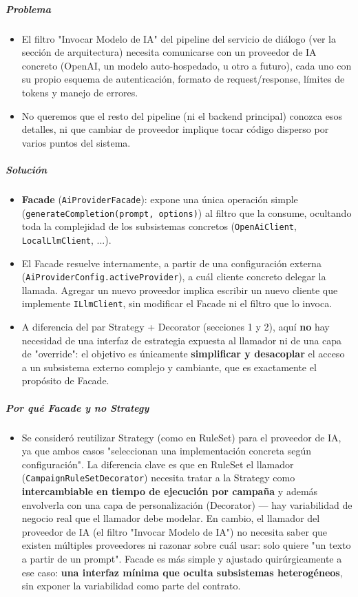 \subparagraph{Problema}
\begin{itemize}[itemsep=2pt,topsep=2pt]
\item El filtro "Invocar Modelo de IA" del pipeline del servicio de diálogo (ver la sección de arquitectura) necesita comunicarse con un proveedor de IA concreto (OpenAI, un modelo auto-hospedado, u otro a futuro), cada uno con su propio esquema de autenticación, formato de request/response, límites de tokens y manejo de errores.
\item No queremos que el resto del pipeline (ni el backend principal) conozca esos detalles, ni que cambiar de proveedor implique tocar código disperso por varios puntos del sistema.
\end{itemize}
\subparagraph{Solución}
\begin{itemize}[itemsep=2pt,topsep=2pt]
\item \textbf{Facade} (\texttt{AiProviderFacade}): expone una única operación simple (\texttt{generateCompletion(prompt, options)}) al filtro que la consume, ocultando toda la complejidad de los subsistemas concretos (\texttt{OpenAiClient}, \texttt{LocalLlmClient}, ...).
\item El Facade resuelve internamente, a partir de una configuración externa (\texttt{AiProviderConfig.\allowbreak{}activeProvider}), a cuál cliente concreto delegar la llamada. Agregar un nuevo proveedor implica escribir un nuevo cliente que implemente \texttt{ILlmClient}, sin modificar el Facade ni el filtro que lo invoca.
\item A diferencia del par Strategy + Decorator (secciones 1 y 2), aquí \textbf{no} hay necesidad de una interfaz de estrategia expuesta al llamador ni de una capa de "override": el objetivo es únicamente \textbf{simplificar y desacoplar} el acceso a un subsistema externo complejo y cambiante, que es exactamente el propósito de Facade.
\end{itemize}
\subparagraph{Por qué Facade y no Strategy}
\begin{itemize}[itemsep=2pt,topsep=2pt]
\item Se consideró reutilizar Strategy (como en RuleSet) para el proveedor de IA, ya que ambos casos "seleccionan una implementación concreta según configuración". La diferencia clave es que en RuleSet el llamador (\texttt{CampaignRuleSetDecorator}) necesita tratar a la Strategy como \textbf{intercambiable en tiempo de ejecución por campaña} y además envolverla con una capa de personalización (Decorator) — hay variabilidad de negocio real que el llamador debe modelar. En cambio, el llamador del proveedor de IA (el filtro "Invocar Modelo de IA") no necesita saber que existen múltiples proveedores ni razonar sobre cuál usar: solo quiere "un texto a partir de un prompt". Facade es más simple y ajustado quirúrgicamente a ese caso: \textbf{una interfaz mínima que oculta subsistemas heterogéneos}, sin exponer la variabilidad como parte del contrato.
\end{itemize}
